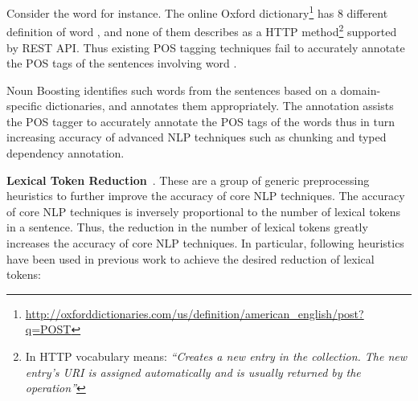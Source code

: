 Consider the word  for instance. 
The online Oxford dictionary\footnote{\url{http://oxforddictionaries.com/us/definition/american_english/post?q=POST}} has 8 different definition of word , and none of them describes  as a HTTP method\footnote{In HTTP vocabulary  means: \textit{``Creates a new entry in the collection.
The new entry's URI is assigned automatically and is usually returned by the operation''}}
supported by REST API.
Thus existing POS tagging techniques fail to accurately annotate the POS tags of the sentences involving word .  

Noun Boosting identifies such words from the sentences based on a domain-specific dictionaries, and annotates them appropriately.
The annotation assists the POS tagger to accurately annotate the POS tags of the words thus in turn increasing accuracy of advanced NLP techniques such as chunking and typed dependency annotation.

\textbf{Lexical Token Reduction}~\cite{pandita13:WHYPER}.
These are a group of generic preprocessing heuristics to further improve the accuracy of core NLP techniques.
The accuracy of core NLP techniques is inversely proportional to the number of lexical tokens in a sentence.
Thus, the reduction in the number of lexical tokens greatly increases the accuracy of core NLP techniques. 
In particular, following heuristics have been used in previous work to achieve the desired reduction of lexical tokens:

